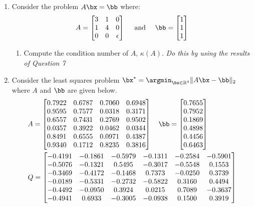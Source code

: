 \documentclass[10pt]{article}
\begin{document}
\begin{enumerate}
\item Consider the problem $A\bx = \bb$ where:
$$
A = \left[\begin{matrix} 3 & 1 & 0 \\ 1 & 4 & 0 \\ 0 & 0 & \epsilon \end{matrix}\right] \quad \text{ and } \quad \bb = \left[\begin{matrix} 1 \\ 1 \\ 1 \end{matrix}\right]
$$
\begin{enumerate}
	\item Compute the condition number of $A$, $\kappa(A)$. {\em Do this by using the results of Question 7} \\
\end{enumerate}
\item Consider the least squares problem $\displaystyle \bx^{*} = \argmin_{\bx\in\mathbb{R}^{4}} \|A\bx - \bb\|_{2}$ where $A$ and $\bb$ are given below. 
\begin{align*}
& A = \left[\begin{matrix} 0.7922 & 0.6787 & 0.7060 & 0.6948 \\ 0.9595 & 0.7577 & 0.0318 & 0.3171 \\ 0.6557 & 0.7431 & 0.2769 & 0.9502 \\ 0.0357 & 0.3922 & 0.0462 & 0.0344 \\ 0.8491 & 0.6555 & 0.0971 & 0.4387 \\ 0.9340 & 0.1712 & 0.8235 & 0.3816 \end{matrix} \right] \quad \bb = \left[\begin{matrix} 0.7655 \\ 0.7952 \\ 0.1869 \\ 0.4898 \\ 0.4456 \\ 0.6463 \end{matrix}\right] \\
&  Q = \left[\begin{matrix} -0.4191 & -0.1861 & -0.5979 & -0.1311 & -0.2584 & -0.5901 \\ -0.5076 & -0.1321 & 0.5495 & -0.3017 & -0.5548 & 0.1553 \\ -0.3469 & -0.4172 & -0.1468 & 0.7373 & -0.0250 & 0.3739 \\ -0.0189 & -0.5331 & -0.2732 & -0.5822 & 0.3160 & 0.4494 \\ -0.4492 & -0.0950 & 0.3924 & 0.0215 & 0.7089 & -0.3637 \\ -0.4941 & 0.6933 & -0.3005 & -0.0938 & 0.1500 & 0.3919 \end{matrix}\right] \\

\end{align*}
\end{enumerate}
\end{document}
